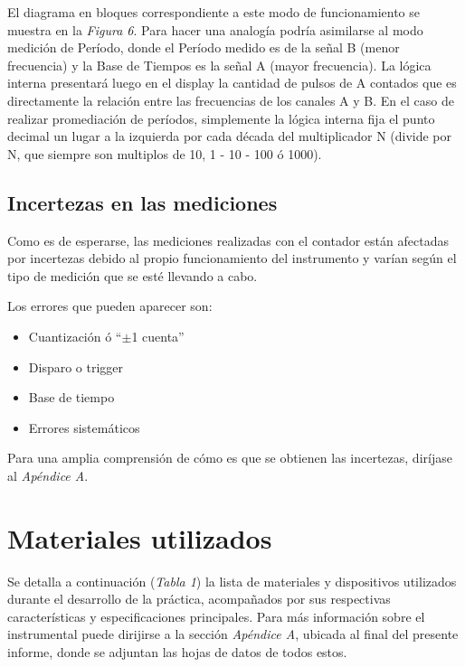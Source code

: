 \documentclass{article}
\begin{document}
	El diagrama en bloques correspondiente a este modo de funcionamiento se muestra en la \textit{Figura 6}. Para hacer una analogía podría asimilarse al modo medición de Período, donde el Período medido es de la señal B (menor frecuencia) y la Base de Tiempos es la señal A (mayor frecuencia). La lógica interna presentará luego en el display la cantidad de pulsos de A contados que es directamente la relación entre las frecuencias de los canales A y B. En el caso de realizar promediación de períodos, simplemente la lógica interna fija el punto decimal un lugar a la izquierda por cada década del multiplicador N (divide por N, que siempre son multiplos de 10, 1 - 10 - 100 ó 1000).
\bigskip\bigskip



\subsection{Incertezas en las mediciones} 
\medskip
	
	Como es de esperarse, las mediciones realizadas con el contador están afectadas por incertezas debido al propio funcionamiento del instrumento y varían según el tipo de medición que se esté llevando a cabo.
	\par
	Los errores que pueden aparecer son:

	\begin{itemize}
		\itemsep=3pt \topsep=0pt \partopsep=0pt \parskip=0pt \parsep=0pt
	
		\item Cuantización ó ``$\pm$1 cuenta''
		\item Disparo o trigger
		\item Base de tiempo
		\item Errores sistemáticos
	\end{itemize}
	\medskip

\noindent Para una amplia comprensión de cómo es que se obtienen las incertezas, diríjase al \textit{Apéndice A}.
\bigskip\bigskip




\section{Materiales utilizados}

	Se detalla a continuación (\textit{Tabla 1}) la lista de materiales y dispositivos utilizados durante el desarrollo de la práctica, acompañados por sus respectivas características y especificaciones principales. Para más información sobre el instrumental puede dirijirse a la sección \textit{Apéndice A}, ubicada al final del presente informe, donde se adjuntan las hojas de datos de todos estos.
\bigskip\bigskip
\end{document}

